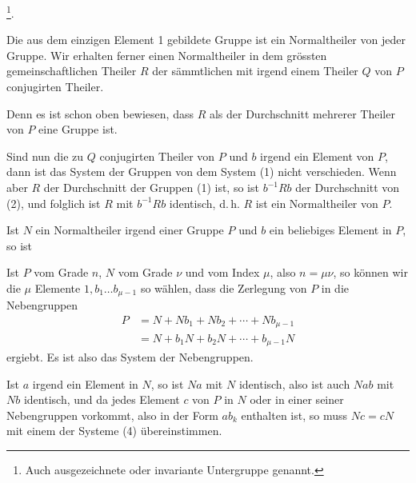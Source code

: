 
\footnote{Auch ausgezeichnete oder invariante Untergruppe genannt.}.

Die aus dem einzigen Element 1 gebildete Gruppe ist ein Normaltheiler von
jeder Gruppe. Wir erhalten ferner einen Normaltheiler in dem grössten
gemeinschaftlichen Theiler $R$ der sämmtlichen mit irgend einem Theiler
$Q$ von $P$ conjugirten Theiler.

Denn es ist schon oben bewiesen, dass $R$ als der Durchschnitt mehrerer
Theiler von $P$ eine Gruppe ist.

Sind nun
die zu $Q$ conjugirten Theiler von $P$ und $b$ irgend ein Element von $P$,
dann ist das System der Gruppen
von dem System (1) nicht verschieden. Wenn aber $R$ der Durchschnitt der
Gruppen (1) ist, so ist $b^{-1}Rb$ der Durchschnitt von (2), und folglich
ist $R$ mit $b^{-1}Rb$ identisch, d.\,h. $R$ ist ein Normaltheiler von $P$.

Ist $N$ ein Normaltheiler irgend einer Gruppe $P$ und $b$ ein beliebiges
Element in $P$, so ist

Ist $P$ vom Grade $n$, $N$ vom Grade $\nu$ und vom Index $\mu$, also
$n = \mu\nu$, so können wir die $\mu$ Elemente $1, b_1 \ldots b_{\mu-1}$ so
wählen, dass die Zerlegung von $P$ in die Nebengruppen
\[
\begin{aligned}
P &= N + Nb_1 + Nb_2 + \cdots + Nb_{\mu-1} \\
  &= N + b_1 N + b_2 N + \cdots + b_{\mu-1} N
\end{aligned}
\]
ergiebt. Es ist also
das System der Nebengruppen.

Ist $a$ irgend ein Element in $N$, so ist $Na$ mit $N$ identisch, also ist
auch $Nab$ mit $Nb$ identisch, und da jedes Element $c$ von $P$ in $N$
oder in einer seiner Nebengruppen vorkommt, also in der Form $ab_k$
enthalten ist, so muss $Nc = cN$ mit einem der Systeme (4)
übereinstimmen.
